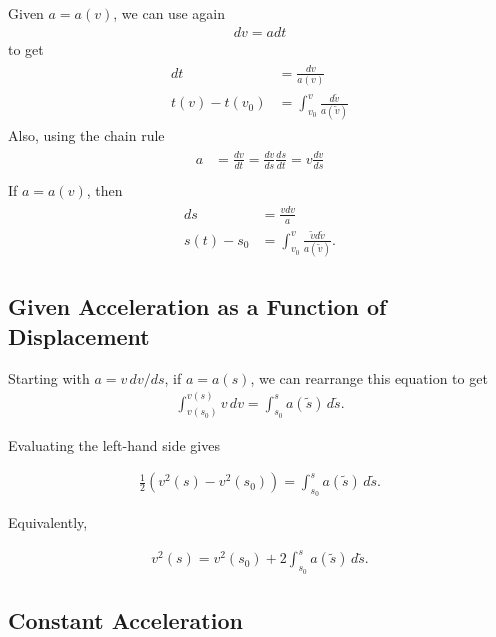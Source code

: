 \documentclass[
  letterpaper,
  DIV=11,
  numbers=noendperiod]{scrreprt}
\begin{document}
Given \(a=a(v)\), we can use again \begin{align}
    dv = a dt
\end{align} to get \begin{align}
    \begin{split}
        dt &= \frac{dv}{a(v)}\\
        t(v) - t(v_0) &= \int_{v_0}^{v}\frac{d\tilde{v}}{a(\tilde{v})}
    \end{split} 
\end{align} Also, using the chain rule \begin{align}
\begin{split}
    a &= \frac{dv}{dt} = \frac{dv}{ds}\frac{ds}{dt}=v\frac{dv}{ds}\\
\end{split}
\end{align} If \(a=a(v)\), then \begin{align}
    \begin{split}
        ds &= \frac{vdv}{a}\\
        s(t)-s_0 &=\int_{v_0}^{v}\frac{\tilde{v}d\tilde{v}}{a(\tilde{v})}.
    \end{split}
\end{align}

\subsection{Given Acceleration as a Function of
Displacement}\label{given-acceleration-as-a-function-of-displacement}

Starting with \(a = v\,dv/ds\), if \(a=a(s)\), we can rearrange this
equation to get \begin{align*}
\int_{v(s_0)}^{v(s)} v\,dv
=
\int_{s_0}^{s} a(\tilde{s})\,d\tilde{s}.
\end{align*}

Evaluating the left-hand side gives

\begin{align*}
\frac{1}{2}\left(v^2(s)-v^2(s_0)\right)
=
\int_{s_0}^{s} a(\tilde{s})\,d\tilde{s}.
\end{align*}

Equivalently,

\begin{align*}
v^2(s)
=
v^2(s_0)
+
2\int_{s_0}^{s} a(\tilde{s})\,d\tilde{s}.
\end{align*}

\subsection{Constant Acceleration}\label{constant-acceleration}
\end{document}
